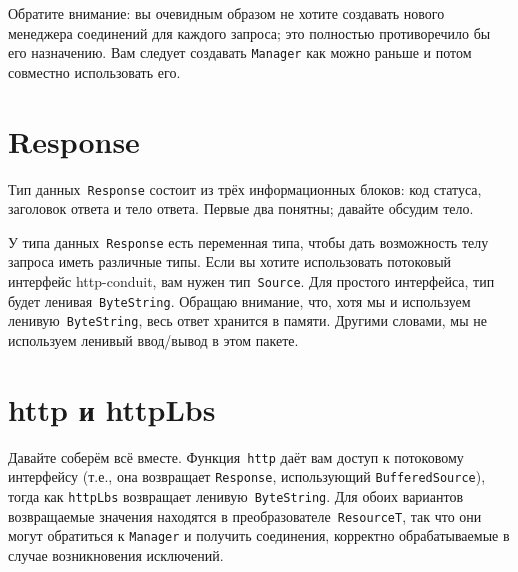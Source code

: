 Обратите внимание: вы очевидным образом не хотите создавать нового
менеджера соединений для каждого запроса; это полностью противоречило бы
его назначению. Вам следует создавать \lstinline!Manager! как можно
раньше и потом совместно использовать его.

\section{Response}
Тип данных~\lstinline!Response! состоит из трёх информационных блоков:
код статуса, заголовок ответа и тело ответа. Первые два понятны;
давайте обсудим тело.

У типа данных~\lstinline!Response! есть переменная типа, чтобы дать
возможность телу запроса иметь различные типы. Если вы хотите
использовать потоковый интерфейс http-conduit, вам нужен
тип~\lstinline!Source!. Для простого интерфейса, тип будет
ленивая~\lstinline!ByteString!. Обращаю внимание, что, хотя мы и
используем ленивую~\lstinline!ByteString!, весь ответ хранится в
памяти. Другими словами, мы не используем ленивый ввод/вывод в этом
пакете.


\section{http и httpLbs}
Давайте соберём всё вместе. Функция~\lstinline!http! даёт вам доступ к
потоковому интерфейсу (т.е., она возвращает \lstinline!Response!,
использующий \lstinline!BufferedSource!), тогда как
\lstinline!httpLbs! возвращает ленивую~\lstinline!ByteString!. Для
обоих вариантов возвращаемые значения находятся в
преобразователе~\lstinline!ResourceT!, так что они могут
обратиться к \lstinline!Manager! и получить соединения, корректно
обрабатываемые в случае возникновения исключений.

